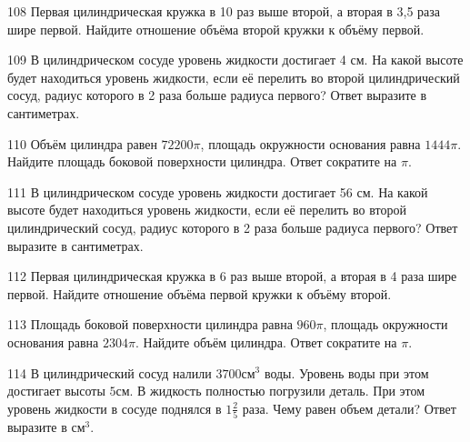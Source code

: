 \documentclass[4apaper]{article}
\begin{document}
\begin{taskBN}{108}
 Первая цилиндрическая кружка в 10 раз выше второй, а вторая в 3,5 раза шире первой. Найдите отношение объёма второй кружки к объёму первой.
\end{taskBN}

\begin{taskBN}{109}
В цилиндрическом сосуде уровень жидкости достигает 4 см. На какой высоте будет находиться уровень жидкости, если её перелить во второй цилиндрический сосуд, радиус которого в 2 раза больше радиуса первого? Ответ выразите в сантиметрах.
\end{taskBN}

\begin{taskBN}{110}
Объём цилиндра равен $72200\pi$, площадь окружности основания равна $1444\pi$. Найдите площадь боковой поверхности цилиндра. Ответ сократите на $\pi$.
\end{taskBN}

\begin{taskBN}{111}
В цилиндрическом сосуде уровень жидкости достигает 56 см. На какой высоте будет находиться уровень жидкости, если её перелить во второй цилиндрический сосуд, радиус которого в 2 раза больше радиуса первого? Ответ выразите в сантиметрах.
\end{taskBN}

\begin{taskBN}{112}
 Первая цилиндрическая кружка в 6 раз выше второй, а вторая в 4 раза шире первой. Найдите отношение объёма первой кружки к объёму второй.
\end{taskBN}

\begin{taskBN}{113}
Площадь боковой поверхности цилиндра равна $960\pi$, площадь окружности основания равна $2304\pi$. Найдите объём цилиндра. Ответ сократите на $\pi$.
\end{taskBN}

\begin{taskBN}{114}
В цилиндрический сосуд налили $3700\mbox{см}^3$ воды. Уровень воды при этом достигает высоты $5$см. В жидкость полностью погрузили деталь. При этом уровень жидкости в сосуде поднялся в ${1}\frac{2}{5}$ раза. Чему равен объем детали? Ответ выразите в $\mbox{см}^3$.
\end{taskBN}
\end{document}

